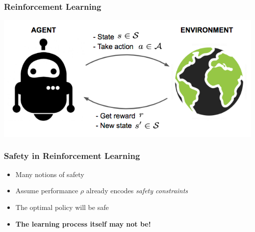 \documentclass[aspectratio=169]{beamer}
\begin{document}
\begin{frame}
\begin{overlayarea}{\textwidth}{\textheight}
\frametitle{Reinforcement Learning{\small~\citep{sutton2018reinforcement}}}
\centering
\includegraphics[width=.5\textwidth]{pics/rl2.png}\\
\vspace{.25cm}

\vspace{.25cm}
\end{overlayarea}
\end{frame}

\begin{frame}
\frametitle{Safety in Reinforcement Learning}
\begin{itemize}
	\setlength{\itemsep}{20pt}
	\item<1-> Many notions of safety ~\citep{amodei2016concrete,garcia2015comprehensive}
	\item<2-> Assume performance $\rho$ already encodes \emph{safety constraints}
	\item<3-> The optimal policy will be safe
	\item<4-> \textbf{The learning process itself may not be!}
\end{itemize}
\end{frame}
\end{document}

